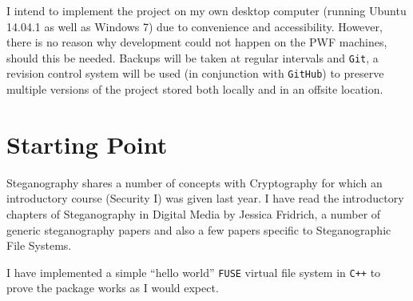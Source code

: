 \documentclass[paper=a4, fontsize=11pt,twoside]{scrartcl}
\numberwithin{table}{section}
\numberwithin{figure}{section}
\numberwithin{algorithm}{section}
\begin{document}
I intend to implement the project on my own desktop computer (running Ubuntu 14.04.1 as well as Windows 7) due to convenience and accessibility. However, there is no reason why development could not happen on the PWF machines, should this be needed.
Backups will be taken at regular intervals and \texttt{Git}, a revision control system will be used (in conjunction with \texttt{GitHub}) to preserve multiple versions of the project stored both locally and in an offsite location.

\section*{Starting Point}
Steganography shares a number of concepts with Cryptography for which an introductory course (Security I) was given last year. I have read the introductory chapters of Steganography in Digital Media by Jessica Fridrich, a number of generic steganography papers and also a few papers specific to Steganographic File Systems.

I have implemented a simple ``hello world'' \texttt{FUSE} virtual file system in \texttt{C++} to prove the package works as I would expect.
\end{document}
